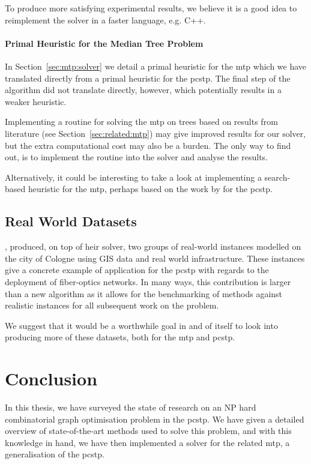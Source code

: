 To produce more satisfying experimental results, we believe it is a good idea to reimplement
the solver in a faster language, e.g. C++.

\paragraph{Primal Heuristic for the Median Tree Problem}
In Section~\ref{sec:mtp:solver} we detail a primal heuristic for the \gls{mtp}
which we have translated directly from a primal heuristic for the \gls{pcstp}.
The final step of the algorithm did not translate directly, however, which potentially
results in a weaker heuristic.

Implementing a routine for solving the \gls{mtp} on trees based on results from literature
(see Section~\ref{sec:related:mtp}) may give improved results for our solver,
but the extra computational cost may also be a burden. The only way to find out, is
to implement the routine into the solver and analyse the results.

Alternatively, it could be interesting to take a look at implementing a search-based
heuristic for the \gls{mtp}, perhaps based on the work by \citet{canuto2001local}
for the \gls{pcstp}.

\subsection{Real World Datasets}
\citet{ljubic2006algorithmic}, produced, on top of heir solver,
two groups of real-world
instances modelled on the city of Cologne using GIS data and real world infrastructure.
These instances give a concrete example of application for the \gls{pcstp} with regards
to the deployment of fiber-optics networks.
In many ways, this contribution is larger than
a new algorithm as it allows for the benchmarking of methods against realistic instances
for all subsequent work on the problem.

We suggest that it would be a worthwhile goal in and of itself to look into
producing more of these
datasets, both for the \gls{mtp} and \gls{pcstp}.

\section{Conclusion}\label{sec:con:con}
In this thesis, we have surveyed the state of research on
an NP hard combinatorial graph optimisation problem in
the \acrlong{pcstp}. We have given a detailed overview of state-of-the-art
methods used to solve this problem, and
with this knowledge in hand, we have then implemented a solver for the related
\acrlong{mtp}, a generalisation of the \gls{pcstp}.
\medskip


